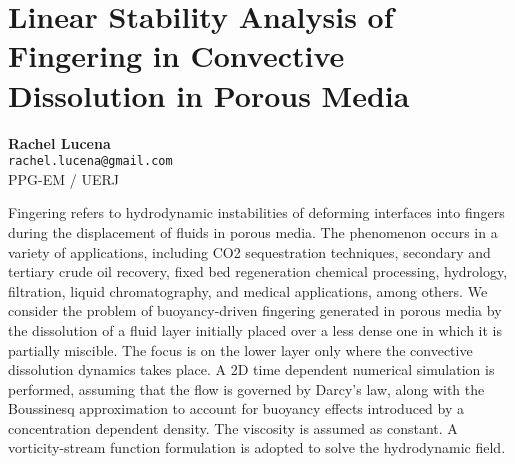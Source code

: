 
\section{Linear Stability Analysis of Fingering in Convective Dissolution in Porous Media}

\textbf{Rachel Lucena}\\
\texttt{\small{rachel.lucena@gmail.com}}\\
PPG-EM / UERJ

Fingering refers to hydrodynamic instabilities of deforming interfaces
into fingers during the displacement of fluids in porous media. The
phenomenon occurs in a variety of applications, including CO2
sequestration techniques, secondary and tertiary crude oil recovery,
fixed bed regeneration chemical processing, hydrology, filtration,
liquid chromatography, and medical applications, among others. We
consider the problem of buoyancy-driven fingering generated in porous
media by the dissolution of a fluid layer initially placed over a less
dense one in which it is partially miscible. The focus is on the lower
layer only where the convective dissolution dynamics takes place. A 2D
time dependent numerical simulation is performed, assuming that the flow
is governed by Darcy's law, along with the Boussinesq approximation to
account for buoyancy effects introduced by a concentration dependent
density. The viscosity is assumed as constant. A vorticity-stream
function formulation is adopted to solve the hydrodynamic field.

